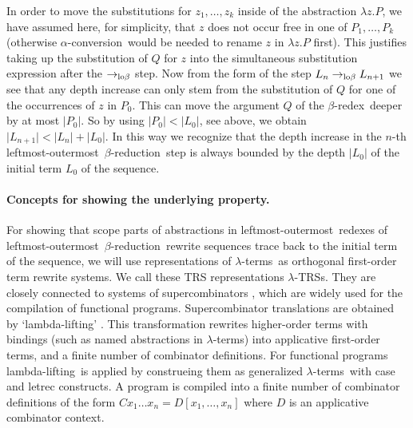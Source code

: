 \documentclass[
submission
]{dmtcs-episciences-tampered}
\newcommand{\indap}[2]{#1 _{#2}}
\newcommand{\nb}{\nobreakdash}
\newcommand{\nf}{\normalfont}
\newcommand{\cvar}{z}
\newcommand{\cvari}{\indap{\cvar}}
\newcommand{\TRS}{TRS}
\newcommand{\cxtap}[2]{{#1}[#2]}
\newcommand{\bcxt}{D}
\newcommand{\bcxtap}{\cxtap{\bcxt}}
\newcommand{\sdepth}{\text{\nf d}}
\newcommand{\depth}[1]{\lvert{#1}\rvert} \newcommand{\depthbig}[1]{\big\lvert{#1}\big\rvert} \newcommand{\sudepth}{\indap{\sdepth}{\text{\nf u}}}
\newcommand{\clter}{L}
\newcommand{\dlter}{P}
\newcommand{\elter}{Q}
\newcommand{\clteri}{\indap{\clter}}
\newcommand{\dlteri}{\indap{\dlter}}
\newcommand{\sslabs}{\lambda}
\newcommand{\slabs}[1]{\sslabs{#1}.}
\newcommand{\labs}[2]{\slabs{#1}{#2}}
\newcommand{\sred}{\to}
\newcommand{\sredi}{\indap{\sred}}
\newcommand{\scriptlobeta}{\text{\nf lo}\beta}
\newcommand{\slobetared}{\sredi{\scriptlobeta}}
\newcommand{\lobetared}{\mathrel{\slobetared}}
\newcommand{\lambdaterm}{$\lambda$\nb-term}
\newcommand{\lambdaterms}{\lambdaterm{s}}
\newcommand{\lambdalifting}{lambda-lif\-ting}
\newcommand{\betareduction}{$\beta$\nb-re\-duc\-tion}
\newcommand{\betaredex}{$\beta$\nb-re\-dex}
\newcommand{\alphaconversion}{$\alpha$\nb-con\-ver\-sion}
\newcommand{\lo}{left\-most-outer\-most}
\newcommand{\lTRS}{$\lambda$\hspace*{-0.5pt}\nb-\hspace*{-0.5pt}\TRS}
\newcommand{\lTRSs}{\lTRS{s}}
\theoremstyle{plain}
\theoremstyle{definition}
\begin{document}
  In order to move the substitutions for $\cvari{1},\ldots,\cvari{k}$ inside of the abstraction $\labs{\cvar}{\dlter}$,
  we have assumed here, for simplicity, that $\cvar$ does not occur free in one of $\dlteri{1},\ldots,\dlteri{k}$
  (otherwise \alphaconversion\ would be needed to rename $\cvar$ in $\labs{\cvar}{\dlter}$ first).
  This justifies taking up the substitution of $\elter$ for $\cvar$ into the simultaneous substitution expression 
  after the $\slobetared$ step. 
  Now from the form of the step $\clteri{n} \lobetared \clteri{n+1}$
  we see that any depth increase can only stem from the substitution of $\elter$ for one of the occurrences of $\cvar$ in $\dlteri{0}$.
  This can move the argument $\elter$ of the \betaredex\ deeper by at most $\depth{\dlteri{0}}$.
  So by using $\depth{\dlteri{0}} < \depth{\clteri{0}}$, see above, we obtain 
    $\depth{\clteri{n+1}} < \depth{\clteri{n}} + \depth{\clteri{0}}$.
  In this way we recognize that the depth increase in the $n$\nb-th \lo\ \betareduction\ step is always bounded by the depth $\depth{\clteri{0}}$ of the initial term $\clteri{0}$ of the sequence.


\paragraph{Concepts for showing the underlying property.}
  For showing that scope parts of abstractions in \lo\ redexes of \lo\ \betareduction\ rewrite sequences trace back to the initial term of the sequence,
  we will use representations of \lambdaterms\ as orthogonal first-order term rewrite systems.
  We call these TRS representations \lTRSs.
  They are closely connected to systems of supercombinators \cite{hugh:1982:report,hugh:1982},
  which are widely used for the compilation of functional programs. 
Supercombinator translations are obtained by `\lambdalifting' \cite{peyt:1987}.
  This transformation rewrites higher-order terms with bindings (such as named abstractions in \lambdaterms)
  into applicative first-order terms, and a finite number of combinator definitions.
  For functional programs \lambdalifting\ is applied by construeing them as 
  generalized \lambdaterms\ with \textsf{case} and \textsf{letrec} constructs.
  A program is compiled into a finite number of combinator definitions 
  of the form $ C x_1 \ldots x_n = \bcxtap{x_1,\ldots,x_n} $ where $\bcxt$ is an applicative combinator context.
  
\end{document}
